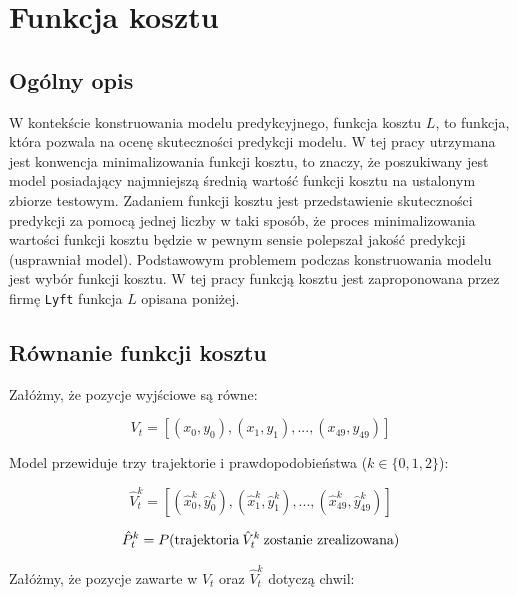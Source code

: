 \chapter{Funkcja kosztu}
\thispagestyle{chapterBeginStyle}

\section{Ogólny opis}
W kontekście konstruowania modelu predykcyjnego, funkcja kosztu $L$, to funkcja, która pozwala na ocenę skuteczności predykcji modelu. W tej pracy utrzymana jest konwencja minimalizowania funkcji kosztu, to znaczy, że poszukiwany jest model posiadający najmniejszą średnią wartość funkcji kosztu na ustalonym zbiorze testowym. Zadaniem funkcji kosztu jest przedstawienie skuteczności predykcji za pomocą jednej liczby w taki sposób, że proces minimalizowania wartości funkcji kosztu będzie w pewnym sensie polepszał jakość predykcji (usprawniał model). Podstawowym problemem podczas konstruowania modelu jest wybór funkcji kosztu. W tej pracy funkcją kosztu jest zaproponowana przez firmę \texttt{Lyft} funkcja $L$ opisana poniżej.

\section{Równanie funkcji kosztu}

\noindent
Załóżmy, że pozycje wyjściowe są równe:

\begin{equation}
V_{t} = [(x_{0},y_{0}), (x_{1},y_{1}), ... , (x_{49},y_{49})]
\end{equation}

\noindent
Model przewiduje trzy trajektorie i prawdopodobieństwa ($k \in \{0, 1, 2\}$):

\begin{equation}
\hat{V}_{t}^{k} = [(\hat{x}_{0}^{k},\hat{y}_{0}^{k}), (\hat{x}_{1}^{k},\hat{y}_{1}^{k}), ... , (\hat{x}_{49}^{k},\hat{y}_{49}^{k})]
\end{equation}

\begin{equation}
\hat{P}_{t}^{k} = P(\text{\upshape trajektoria}\:\hat{V}_{t}^{k}\:\text{\upshape zostanie zrealizowana})
\end{equation}

\noindent
Załóżmy, że pozycje zawarte w $V_{t}$ oraz $\hat{V}_{t}^{k}$ dotyczą chwil:

\begin{equation}
[t+0.1, t+0.2, ... , t+5.0]
\end{equation}

